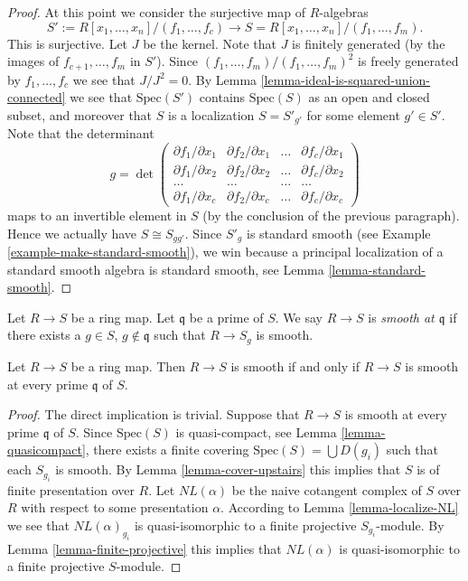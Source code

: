 \begin{proof}
\medskip\noindent
At this point we consider the surjective map of $R$-algebras
$$
S' := R[x_1, \ldots, x_n]/(f_1, \ldots, f_c)
\longrightarrow
S = R[x_1, \ldots, x_n]/(f_1, \ldots, f_m).
$$
This is surjective. Let $J$ be the kernel. Note that
$J$ is finitely generated (by the images of $f_{c + 1}, \ldots, f_m$
in $S'$). Since $(f_1, \ldots, f_m)/(f_1, \ldots, f_m)^2$ is freely
generated by $f_1, \ldots, f_c$ we see that $J/J^2 = 0$.
By Lemma \ref{lemma-ideal-is-squared-union-connected}
we see that $\text{Spec}(S')$ contains $\text{Spec}(S)$
as an open and closed subset, and moreover that $S$ is a localization
$S = S'_{g'}$ for some element $g' \in S'$. Note that the determinant
$$
g =
\det
\left(
\begin{matrix}
\partial f_1/\partial x_1 &
\partial f_2/\partial x_1 &
\ldots &
\partial f_c/\partial x_1 \\
\partial f_1/\partial x_2 &
\partial f_2/\partial x_2 &
\ldots &
\partial f_c/\partial x_2 \\
\ldots & \ldots & \ldots & \ldots \\
\partial f_1/\partial x_c &
\partial f_2/\partial x_c &
\ldots &
\partial f_c/\partial x_c
\end{matrix}
\right)
$$
maps to an invertible element in $S$ (by the conclusion of the
previous paragraph). Hence
we actually have $S \cong S_{gg'}$. Since
$S'_g$ is standard smooth (see Example \ref{example-make-standard-smooth}),
we win because a principal localization of a standard smooth
algebra is standard smooth, see Lemma \ref{lemma-standard-smooth}.
\end{proof}

\begin{definition}
\label{definition-smooth-at-prime}
Let $R \to S$ be a ring map.
Let $\mathfrak q$ be a prime of $S$.
We say $R \to S$ is {\it smooth at $\mathfrak q$} if there
exists a $g \in S$, $g \not \in \mathfrak q$ such
that $R \to S_g$ is smooth.
\end{definition}

\begin{lemma}
\label{lemma-locally-smooth}
Let $R \to S$ be a ring map.
Then $R \to S$ is smooth if and only if $R \to S$ is smooth
at every prime $\mathfrak q$ of $S$.
\end{lemma}

\begin{proof}
The direct implication is trivial. Suppose that $R \to S$ is smooth
at every prime $\mathfrak q$ of $S$. Since $\text{Spec}(S)$ is
quasi-compact, see Lemma \ref{lemma-quasicompact},
there exists a finite covering
$\text{Spec}(S) = \bigcup D(g_i)$ such that each $S_{g_i}$ is
smooth. By Lemma \ref{lemma-cover-upstairs} this implies that
$S$ is of finite presentation over $R$. Let $NL(\alpha)$ be
the naive cotangent complex of $S$ over $R$ with respect to some
presentation $\alpha$. According to Lemma \ref{lemma-localize-NL}
we see that
$NL(\alpha)_{g_i}$ is quasi-isomorphic to a finite projective
$S_{g_i}$-module. By Lemma \ref{lemma-finite-projective}
this implies that $NL(\alpha)$ is quasi-isomorphic to a finite
projective $S$-module.
\end{proof}

